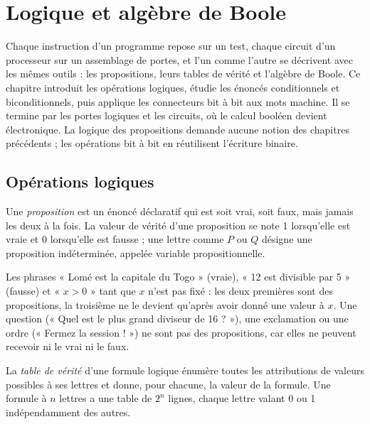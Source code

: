 \chapter{Logique et algèbre de Boole}

\begin{quelqueslignes}
Chaque instruction d'un programme repose sur un test, chaque circuit d'un processeur sur un assemblage de portes, et l'un comme l'autre se décrivent avec les mêmes outils : les propositions, leurs tables de vérité et l'algèbre de Boole. Ce chapitre introduit les opérations logiques, étudie les énoncés conditionnels et biconditionnels, puis applique les connecteurs bit à bit aux mots machine. Il se termine par les portes logiques et les circuits, où le calcul booléen devient électronique. La logique des propositions demande aucune notion des chapitres précédents ; les opérations bit à bit en réutilisent l'écriture binaire.
\end{quelqueslignes}

\section{Opérations logiques}

\begin{definition}[proposition]
Une \emph{proposition} est un énoncé déclaratif qui est soit vrai, soit faux, mais jamais les deux à la fois. La valeur de vérité d'une proposition se note 1 lorsqu'elle est vraie et 0 lorsqu'elle est fausse ; une lettre comme $P$ ou $Q$ désigne une proposition indéterminée, appelée variable propositionnelle.
\end{definition}

Les phrases « Lomé est la capitale du Togo » (vraie), « 12 est divisible par 5 » (fausse) et « $x > 0$ » tant que $x$ n'est pas fixé : les deux premières sont des propositions, la troisième ne le devient qu'après avoir donné une valeur à $x$. Une question (« Quel est le plus grand diviseur de 16 ? »), une exclamation ou une ordre (« Fermez la session ! ») ne sont pas des propositions, car elles ne peuvent recevoir ni le vrai ni le faux.

\begin{definition}
La \emph{table de vérité} d'une formule logique énumère toutes les attributions de valeurs possibles à ses lettres et donne, pour chacune, la valeur de la formule. Une formule à $n$ lettres a une table de $2^{n}$ lignes, chaque lettre valant 0 ou 1 indépendamment des autres.
\end{definition}

